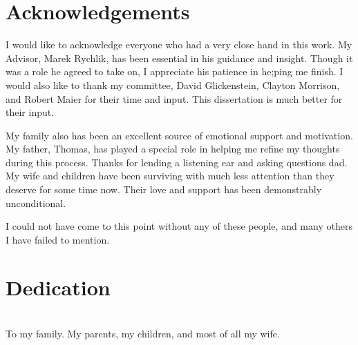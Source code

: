 \thispagestyle{empty}
\maketitle

\thispagestyle{empty}
\iffinal

\chapter*{Acknowledgements}
I would like to acknowledge everyone who had a very close hand in this work. 
My Advisor, Marek Rychlik, has been essential in his guidance and insight. Though it was a role he agreed to take on, I appreciate his patience in he;ping me finish. I would also like to thank my committee, David Glickenstein, Clayton Morrison, and Robert Maier for their time and input. This dissertation is much better for their input. 

My family also has been an excellent source of emotional support and motivation. My father, Thomas, has played a special role in helping me refine my thoughts during this process. Thanks for lending a listening ear and asking questions dad. My wife and children have been surviving with much less attention than they deserve for some time now. Their love and support has been demonstrably unconditional.

I could not have come to this point without any of these people, and many others I have failed to mention.

\newpage


\thispagestyle{empty}
\chapter*{Dedication}
\begin{center}
	\ \\
	To my family. My parents, my children, and most of all my wife.
\end{center}
\newpage
\fi


\tableofcontents

\listoffigures

\listoftables



